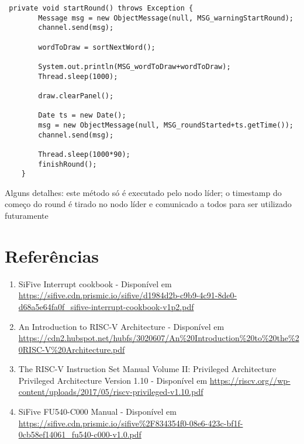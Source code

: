\documentclass{article}
\begin{document}
\begin{lstlisting} 
 private void startRound() throws Exception {
        Message msg = new ObjectMessage(null, MSG_warningStartRound);
        channel.send(msg);
        
        wordToDraw = sortNextWord();
        
        System.out.println(MSG_wordToDraw+wordToDraw);
        Thread.sleep(1000);
        
        draw.clearPanel();
        
        Date ts = new Date();        
        msg = new ObjectMessage(null, MSG_roundStarted+ts.getTime());
        channel.send(msg);
        
        Thread.sleep(1000*90);
        finishRound();
    }
\end{lstlisting} 
Alguns detalhes: este método só é executado pelo nodo líder; o timestamp do começo do round é tirado no nodo líder e comunicado a todos para ser utilizado futuramente
\section{Referências}

\begin{enumerate}
 \item SiFive Interrupt cookbook - Disponível em \url{https://sifive.cdn.prismic.io/sifive/d1984d2b-c9b9-4c91-8de0-d68a5e64fa0f_sifive-interrupt-cookbook-v1p2.pdf}
 \item An Introduction to RISC-V Architecture - Disponível em \url{https://cdn2.hubspot.net/hubfs/3020607/An%20Introduction%20to%20the%20RISC-V%20Architecture.pdf}
 \item The RISC-V Instruction Set Manual Volume II: Privileged Architecture Privileged Architecture Version 1.10 - Disponível em \url{https://riscv.org//wp-content/uploads/2017/05/riscv-privileged-v1.10.pdf}
 \item SiFive FU540-C000 Manual - Disponível em \url{https://sifive.cdn.prismic.io/sifive%2F834354f0-08e6-423c-bf1f-0cb58ef14061_fu540-c000-v1.0.pdf}
\end{enumerate}
\end{document}
